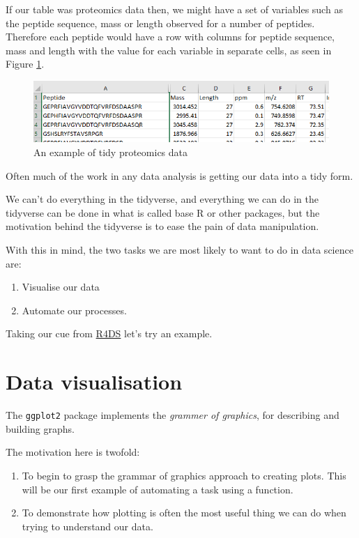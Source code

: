 \documentclass[12pt,]{book}
\providecommand{\tightlist}{%
  \setlength{\itemsep}{0pt}\setlength{\parskip}{0pt}}
\theoremstyle{definition}
\theoremstyle{definition}
\theoremstyle{definition}
\theoremstyle{remark}
\begin{document}
If our table was proteomics data then, we might have a set of variables
such as the peptide sequence, mass or length observed for a number of
peptides. Therefore each peptide would have a row with columns for
peptide sequence, mass and length with the value for each variable in
separate cells, as seen in Figure \ref{fig:tidy-prot}.



\begin{figure}

{\centering \includegraphics[width=0.8\linewidth]{img/tidy_prot_data} 

}

\caption{An example of tidy proteomics data}\label{fig:tidy-prot}
\end{figure}

Often much of the work in any data analysis is getting our data into a
tidy form.

We can't do everything in the tidyverse, and everything we can do in the
tidyverse can be done in what is called base R or other packages, but
the motivation behind the tidyverse is to ease the pain of data
manipulation.

With this in mind, the two tasks we are most likely to want to do in
data science are:

\begin{enumerate}
\def\labelenumi{\arabic{enumi}.}
\tightlist
\item
  Visualise our data
\item
  Automate our processes.
\end{enumerate}

Taking our cue from \href{http://r4ds.had.co.nz/}{R4DS} let's try an
example.

\section{Data visualisation}\label{data-visualisation}

The \texttt{ggplot2} package implements the \emph{grammer of graphics},
for describing and building graphs.

The motivation here is twofold:

\begin{enumerate}
\def\labelenumi{\arabic{enumi}.}
\tightlist
\item
  To begin to grasp the grammar of graphics approach to creating plots.
  This will be our first example of automating a task using a function.
\item
  To demonstrate how plotting is often the most useful thing we can do
  when trying to understand our data.
\end{enumerate}
\end{document}

